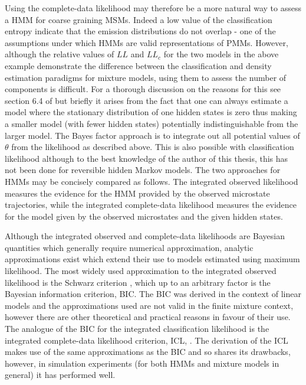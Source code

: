 Using the complete-data likelihood may therefore be a more natural way to assess a HMM for coarse graining MSMs. Indeed a low value of the classification entropy indicate that the emission distributions do not overlap - one of the assumptions under which HMMs are valid representations of PMMs. However, although the relative values of $LL$ and $LL_{c}$ for the two models in the above example demonstrate the difference between the classification and density estimation paradigms for mixture models, using them to assess the number of components is difficult. For a thorough discussion on the reasons for this see section 6.4 of \cite{mclachlanFiniteMixtureModels2000} but briefly it arises from the fact that one can always estimate a model where the stationary distribution of one hidden states is zero thus making a smaller model (with fewer hidden states) potentially indistinguishable from the larger model. The Bayes factor approach is to integrate out all potential values of $\theta$ from the likelihood as described above. This is also possible with classification likelihood \cite{latoucheBayesianMethodsGraph2010} although to the best knowledge of the author of this thesis, this has not been done for reversible hidden Markov models. The two approaches for HMMs may be concisely compared as follows. The integrated observed likelihood measures the evidence for the HMM provided by the observed microstate trajectories, while the integrated complete-data likelihood measures the evidence for the model  given by the observed microstates and the given hidden states. 

Although the integrated observed and complete-data likelihoods are Bayesian quantities which generally require numerical approximation, analytic approximations exist which extend their use to models estimated using maximum likelihood. \cite{kassBayesFactors1995}\cite{mclachlanFiniteMixtureModels2000} The most widely used approximation to the integrated observed likelihood is the Schwarz criterion \cite{schwarzEstimatingDimensionModel1978a}, which up to an arbitrary factor is the Bayesian information criterion, BIC. The BIC was derived in the context of linear models and the approximations used are not valid in the finite mixture context, however there are other theoretical and practical reasons in favour of their use. \cite{fraley1998many} The analogue of the BIC for the integrated classification likelihood is the integrated complete-data likelihood criterion, ICL, \cite{biernackiAssessingMixtureModel2000a}.  The derivation of the ICL makes use of the same approximations as the BIC and so shares its drawbacks, however, in simulation experiments (for both HMMs and mixture models in general) it has performed well. \cite{mclachlanFiniteMixtureModels2000}\cite{celeuxSelectingHiddenMarkov2008}\cite{biernackiAssessingMixtureModel2000a}

